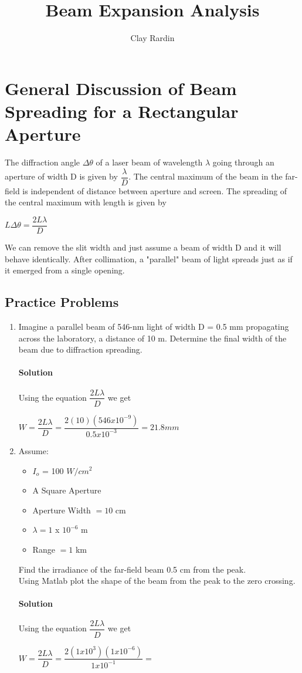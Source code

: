 \documentclass[]{article}
\title {Beam Expansion Analysis}
\author {Clay Rardin}
\begin{document}
\maketitle

\section{General Discussion of Beam Spreading for a Rectangular Aperture}
The diffraction angle $\Delta\theta$ of a laser beam of wavelength $\lambda$ going through an aperture of width D is given by $\dfrac{\lambda}{D}$.  The central maximum of the beam in the far-field is independent of distance between aperture and screen.  The spreading of the central maximum with length is given by \\
\begin{center}
$L \Delta\theta = \dfrac{2L\lambda}{D}$
\end{center}
We can remove the slit width and just assume a beam of width D and it will behave identically.  After collimation, a "parallel" beam of light spreads just as if it emerged from a single opening.

\subsection{Practice Problems}
\begin{enumerate}
\item Imagine a parallel beam of 546-nm light of width D = 0.5 mm propagating across the laboratory, a distance of 10 m.  Determine the final width of the beam due to diffraction spreading.
\paragraph{Solution}
 Using the equation $\dfrac{2L \lambda}{D}$ we get
\begin{center}
$W = \dfrac{2L\lambda}{D} = \dfrac{2 (10) (546 x 10^{-9})}{0.5 x 10^{-3}} = 21.8 mm $
\end{center}
\item Assume: 
\begin{itemize}
\item $I_{o}$ = 100 $W/cm^2$
\item A Square Aperture
\item Aperture Width $= 10$ cm
\item $\lambda = 1$ x $10^{-6}$ m
\item Range $= 1 $ km
\end{itemize}
Find the irradiance of the far-field beam 0.5 cm from the peak.\\
Using Matlab plot the shape of the beam from the peak to the zero crossing.
\paragraph{Solution}
Using the equation $\dfrac{2L \lambda}{D}$ we get
\begin{center}
$W = \dfrac{2L \lambda}{D} = \dfrac{2 (1x10^3)(1x10^{-6})}{1x10^{-1}} = $
\end{center}
\end{enumerate}
\end{document}

